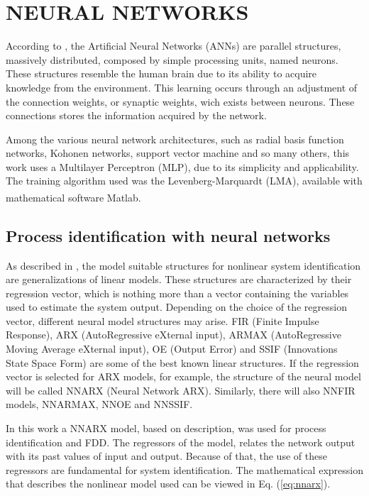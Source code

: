 \documentclass[10pt,fleqn,a4paper]{article}
\newcommand{\reg}{\textsuperscript{\textregistered}}
\begin{document}
\section{NEURAL NETWORKS}\label{sec:ann}
According to \citet{haykin:2000}, the Artificial Neural Networks (ANNs) are
parallel structures, massively distributed, composed by simple processing units,
named neurons. These structures resemble the human brain due to its ability to
acquire knowledge from the environment. This learning occurs through an
adjustment of the connection weights, or synaptic weights, wich exists between
neurons. These connections stores the information acquired by the network.

Among the various neural network architectures, such as radial basis function
networks, Kohonen networks, support vector machine and so many others, this work
uses a Multilayer Perceptron (MLP), due to its simplicity and applicability.
The training algorithm used was the Levenberg-Marquardt (LMA), available with
mathematical software Matlab\reg.

\subsection{Process identification with neural networks}
As described in \citet{lucena:2005}, the model suitable structures for nonlinear
system identification are generalizations of linear models. These structures are
characterized by their regression vector, which is nothing more than a vector
containing the variables used to estimate the system output. Depending on the
choice of the regression vector, different neural model structures may arise.
FIR (Finite Impulse Response), ARX (AutoRegressive eXternal input), ARMAX
(AutoRegressive Moving Average eXternal input), OE (Output Error) and SSIF
(Innovations State Space Form) are some of the best known linear structures. If
the regression vector is selected for ARX models, for example, the structure of
the neural model will be called NNARX (Neural Network ARX). Similarly, there
will also NNFIR models, NNARMAX, NNOE and NNSSIF.

In this work a NNARX model, based on \citet{norgaard:2000} description, was used
for process identification and FDD. The regressors of the model, relates the
network output with its past values of input and output. Because of that, the
use of these regressors are fundamental for system identification. The
mathematical expression that describes the nonlinear model used can be viewed in
Eq. (\ref{eq:nnarx}).
\end{document}
